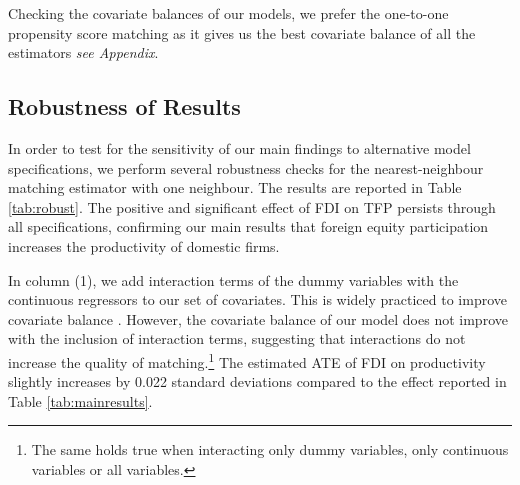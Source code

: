 \documentclass[a4paper,11pt]{scrartcl}
\begin{document}
Checking the covariate balances of our models, we prefer the one-to-one propensity score matching as it gives us the best covariate balance of all the estimators \textit{see Appendix}. %


\subsection{Robustness of Results}

In order to test for the sensitivity of our main findings to alternative model specifications, we perform several robustness checks for the nearest-neighbour matching estimator with one neighbour. The results are reported in Table \ref{tab:robust}. The positive and significant effect of FDI on TFP persists through all specifications, confirming our main results that foreign equity participation increases the productivity of domestic firms. 

In column (1), we add interaction terms of the dummy variables with the continuous regressors to our set of covariates. This is widely practiced to improve covariate balance \citep{Caliendo08}.
However, the covariate balance of our model does not improve with the inclusion of interaction terms, suggesting that interactions do not increase the quality of matching.\footnote{The same holds true when interacting only dummy variables, only continuous variables or all variables.} The estimated ATE of FDI on productivity slightly increases by 0.022 standard deviations compared to the effect reported in Table \ref{tab:mainresults}. 
\end{document}
